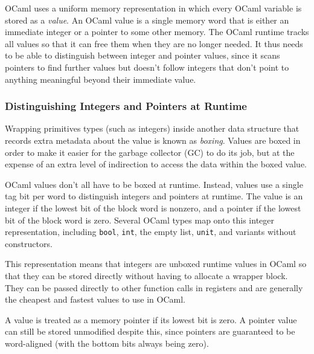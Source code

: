 OCaml uses a uniform memory representation in which every OCaml variable
is stored as a \emph{value}. An OCaml value is a single memory word that
is either an immediate integer or a pointer to some other memory. The
OCaml runtime tracks all values so that it can free them when they are
no longer needed. It thus needs to be able to distinguish between
integer and pointer values, since it scans pointers to find further
values but doesn't follow integers that don't point to anything
meaningful beyond their immediate value. 

\hypertarget{distinguishing-integer-and-pointers-at-runtime}{%
\subsubsection{Distinguishing Integers and Pointers at
Runtime}\label{distinguishing-integer-and-pointers-at-runtime}}

Wrapping primitives types (such as integers) inside another data
structure that records extra metadata about the value is known as
\emph{boxing}. Values are boxed in order to make it easier for the
garbage collector (GC) to do its job, but at the expense of an extra
level of indirection to access the data within the boxed value.

OCaml values don't all have to be boxed at runtime. Instead, values use
a single tag bit per word to distinguish integers and pointers at
runtime. The value is an integer if the lowest bit of the block word is
nonzero, and a pointer if the lowest bit of the block word is zero.
Several OCaml types map onto this integer representation, including
\passthrough{\lstinline!bool!}, \passthrough{\lstinline!int!}, the empty
list, \passthrough{\lstinline!unit!}, and variants without constructors.

This representation means that integers are unboxed runtime values in
OCaml so that they can be stored directly without having to allocate a
wrapper block. They can be passed directly to other function calls in
registers and are generally the cheapest and fastest values to use in
OCaml.

A value is treated as a memory pointer if its lowest bit is zero. A
pointer value can still be stored unmodified despite this, since
pointers are guaranteed to be word-aligned (with the bottom bits always
being zero).

